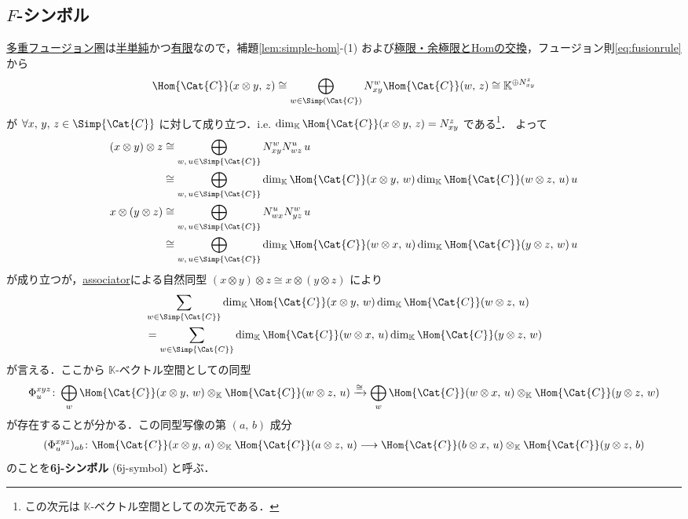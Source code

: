 \documentclass[TQFT_main]{subfiles}
\begin{document}
\subsection{$F$-シンボル}

\hyperref[def:tensorfusion-cat]{多重フュージョン圏}は\hyperref[def:semisimple-cat]{半単純}かつ\hyperref[def:finite-abcat]{有限}なので，補題\ref{lem:simple-hom}-(1) および\hyperref[prop:lim-colim-basic]{極限・余極限とHomの交換}，フュージョン則\eqref{eq:fusionrule}から
\begin{align}
    \Hom{\Cat{C}} (x \otimes y,\, z) \cong \bigoplus_{w \in \Simp(\Cat{C})} N^w_{xy} \Hom{\Cat{C}}(w,\, z) \cong \mathbb{K}^{\oplus N^z_{xy}}
\end{align}
が $\forall x,\, y,\, z \in \Simp{\Cat{C}}$ に対して成り立つ．i.e. $\dim_{\mathbb{K}} \Hom{\Cat{C}} (x \otimes y,\, z) = N^z_{xy}$ である\footnote{この次元は $\mathbb{K}$-ベクトル空間としての次元である．}．
よって
\begin{align}
    (x \otimes y) \otimes z &\cong \bigoplus_{w,\, u \in \Simp{\Cat{C}}} N^w_{xy} N^{u}_{wz}\, u \\
    &\cong \bigoplus_{w,\, u \in \Simp{\Cat{C}}} \dim_{\mathbb{K}}\Hom{\Cat{C}} (x \otimes y,\, w) \dim_{\mathbb{K}}\Hom{\Cat{C}} (w \otimes z,\, u)\, u \\
    x \otimes (y \otimes z) &\cong \bigoplus_{w,\, u \in \Simp{\Cat{C}}} N^{u}_{wx} N^w_{yz}\, u \\
    &\cong \bigoplus_{w,\, u \in \Simp{\Cat{C}}}  \dim_{\mathbb{K}}\Hom{\Cat{C}} (w \otimes x,\, u) \dim_{\mathbb{K}}\Hom{\Cat{C}} (y \otimes z,\, w)\, u
\end{align}
が成り立つが，\hyperref[redef:monoidal-category]{associator}による自然同型 $(x \otimes y) \otimes z \cong x \otimes (y \otimes z)$ により
\begin{align}
    &\sum_{w \in \Simp{\Cat{C}}} \dim_{\mathbb{K}}\Hom{\Cat{C}} (x \otimes y,\, w) \dim_{\mathbb{K}}\Hom{\Cat{C}} (w \otimes z,\, u) \\
    &= \sum_{w \in \Simp{\Cat{C}}} \dim_{\mathbb{K}}\Hom{\Cat{C}} (w \otimes x,\, u) \dim_{\mathbb{K}}\Hom{\Cat{C}} (y \otimes z,\, w)
\end{align}
が言える．ここから $\mathbb{K}$-ベクトル空間としての同型
\begin{align}
    \label{eq:6j}
    \Phi^{xyz}_{u} \colon \bigoplus_{w} \Hom{\Cat{C}} (x \otimes y,\, w) \otimes_{\mathbb{K}} \Hom{\Cat{C}} (w \otimes z,\, u) \xrightarrow{\cong} \bigoplus_{w} \Hom{\Cat{C}} (w \otimes x,\, u) \otimes_{\mathbb{K}} \Hom{\Cat{C}} (y \otimes z,\, w)
\end{align}
が存在することが分かる．この同型写像の第 $(a,\, b)$ 成分
\begin{align}
    \label{def:6j-symbol}
    (\Phi^{xyz}_u)_{ab} \colon \Hom{\Cat{C}} (x \otimes y,\, a) \otimes_{\mathbb{K}} \Hom{\Cat{C}} (a \otimes z,\, u) \lto \Hom{\Cat{C}} (b\otimes x,\, u) \otimes_{\mathbb{K}} \Hom{\Cat{C}} (y \otimes z,\, b)
\end{align}
のことを\textbf{6j-シンボル} (6j-symbol) と呼ぶ．
\end{document}
